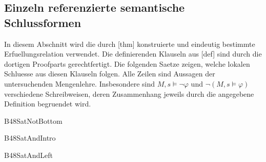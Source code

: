 \subsection*{Einzeln referenzierte semantische Schlussformen}

In diesem Abschnitt wird die durch
[thm] konstruierte und eindeutig
bestimmte Erfuellungsrelation verwendet. Die definierenden Klauseln
aus [def] sind durch die dortigen
Proofparts gerechtfertigt. Die folgenden Saetze zeigen, welche
lokalen Schluesse aus diesen Klauseln folgen.
Alle Zeilen sind Aussagen der untersuchenden Mengenlehre.
Insbesondere sind \(M,s\models\neg\varphi\) und
\(\neg(M,s\models\varphi)\) verschiedene Schreibweisen, deren
Zusammenhang jeweils durch die angegebene Definition begruendet wird.

{B48SatNotBottom}{
}
\begin{tabproof}
\end{tabproof}

{B48SatAndIntro}{
}
\begin{tabproof}
 {}
 {}
\end{tabproof}

{B48SatAndLeft}{
}
\begin{tabproof}
 {}
\end{tabproof}

